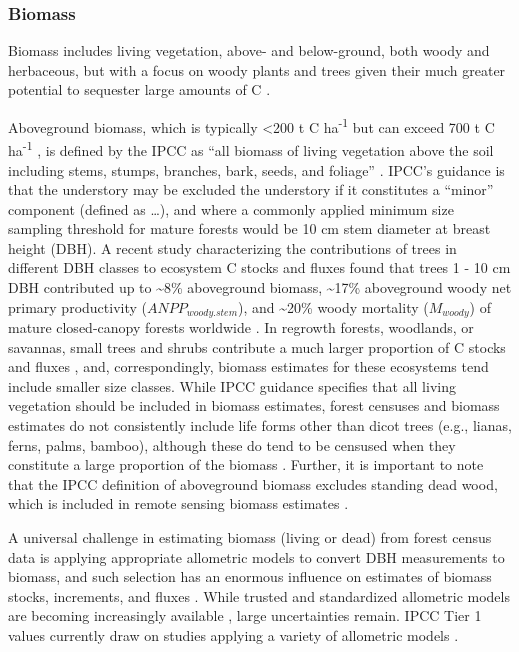 \documentclass[, manuscript]{copernicus}
\begin{document}
\subsubsection{Biomass}

Biomass includes living vegetation, above- and below-ground, both woody
and herbaceous, but with a focus on woody plants and trees given their
much greater potential to sequester large amounts of C
\citep{ipcc_2006_2006}.

Aboveground biomass, which is typically \textless200 t C
ha\textsuperscript{-1} but can exceed 700 t C ha\textsuperscript{-1}
\citep{anderson-teixeira_carbon_2021}, is defined by the IPCC as ``all
biomass of living vegetation above the soil including stems, stumps,
branches, bark, seeds, and foliage''
\citep{ipcc_good_2003, ipcc_2006_2006}. IPCC's guidance is that the
understory may be excluded the understory if it constitutes a ``minor''
component (defined as \ldots{}), and where a commonly applied minimum
size sampling threshold for mature forests would be 10 cm stem diameter
at breast height (DBH). A recent study characterizing the contributions
of trees in different DBH classes to ecosystem C stocks and fluxes found
that trees 1 - 10 cm DBH contributed up to \textasciitilde8\%
aboveground biomass, \textasciitilde17\% aboveground woody net primary
productivity (\(ANPP_{woody.stem}\)), and \textasciitilde20\% woody
mortality (\(M_{woody}\)) of mature closed-canopy forests worldwide
\citep{piponiot_distribution_2022}. In regrowth forests, woodlands, or
savannas, small trees and shrubs contribute a much larger proportion of
C stocks and fluxes
\citep{lutz_global_2018, piponiot_distribution_2022, hughes_biomass_1999},
and, correspondingly, biomass estimates for these ecosystems tend
include smaller size classes. While IPCC guidance specifies that all
living vegetation should be included in biomass estimates, forest
censuses and biomass estimates do not consistently include life forms
other than dicot trees (e.g., lianas, ferns, palms, bamboo), although
these do tend to be censused when they constitute a large proportion of
the biomass \citep[e.g.,][]{fukushima_recovery_2007}. Further, it is
important to note that the IPCC definition of aboveground biomass
excludes standing dead wood, which is included in remote sensing biomass
estimates \citep{duncanson_aboveground_2021}.

A universal challenge in estimating biomass (living or dead) from forest
census data is applying appropriate allometric models to convert DBH
measurements to biomass, and such selection has an enormous influence on
estimates of biomass stocks, increments, and fluxes
\citep{clark_landscapescale_2000, clark_net_2001}. While trusted and
standardized allometric models are becoming increasingly available
\citep{chave_improved_2014, rejou-mechain_biomass_2017, gonzalez-akre_allodb_2022},
large uncertainties remain. IPCC Tier 1 values currently draw on studies
applying a variety of allometric models
\citep[e.g.,][]{requenasuarez_estimating_2019, rozendaal_aboveground_2022}.
\end{document}
